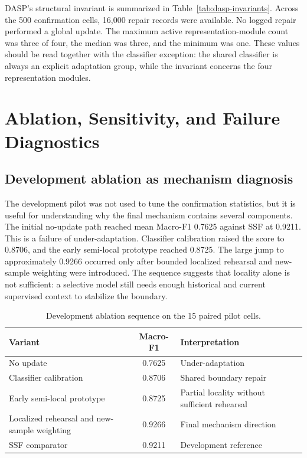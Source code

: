 DASP's structural invariant is summarized in Table~\ref{tab:dasp-invariants}. Across the 500 confirmation cells, 16,000 repair records were available. No logged repair performed a global update. The maximum active representation-module count was three of four, the median was three, and the minimum was one. These values should be read together with the classifier exception: the shared classifier is always an explicit adaptation group, while the invariant concerns the four representation modules.

\section{Ablation, Sensitivity, and Failure Diagnostics}
\label{sec:ablation-expanded}

\subsection{Development ablation as mechanism diagnosis}
The development pilot was not used to tune the confirmation statistics, but it is useful for understanding why the final mechanism contains several components. The initial no-update path reached mean Macro-F1 0.7625 against SSF at 0.9211. This is a failure of under-adaptation. Classifier calibration raised the score to 0.8706, and the early semi-local prototype reached 0.8725. The large jump to approximately 0.9266 occurred only after bounded localized rehearsal and new-sample weighting were introduced. The sequence suggests that locality alone is not sufficient: a selective model still needs enough historical and current supervised context to stabilize the boundary.

\begin{table}[t]
\caption{Development ablation sequence on the 15 paired pilot cells.}
\label{tab:development-ablation}
\centering
\scriptsize
\begin{tabular}{p{}cp{}}
\toprule
Variant & Macro-F1 & Interpretation\\
\midrule
No update & 0.7625 & Under-adaptation\\
Classifier calibration & 0.8706 & Shared boundary repair\\
Early semi-local prototype & 0.8725 & Partial locality without sufficient rehearsal\\
Localized rehearsal and new-sample weighting & 0.9266 & Final mechanism direction\\
SSF comparator & 0.9211 & Development reference\\
\bottomrule
\end{tabular}
\end{table}


